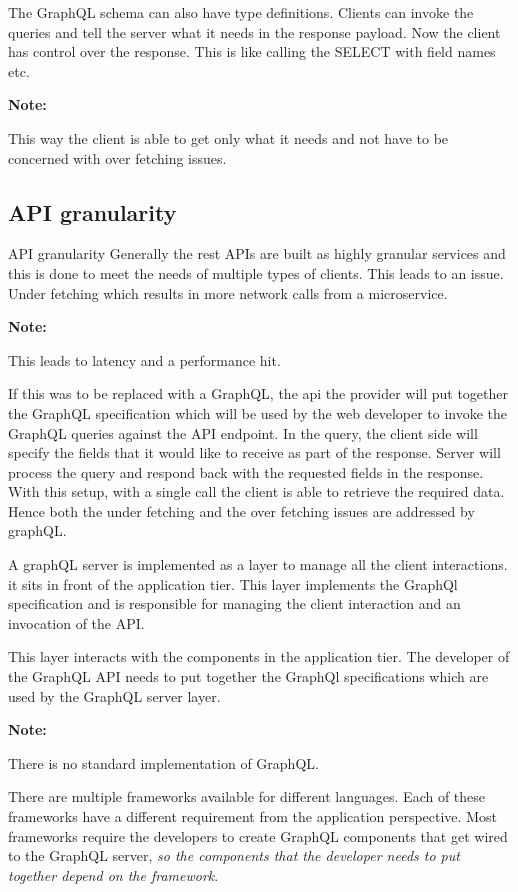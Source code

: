 \documentclass[a4paper, 11pt]{book}
\newenvironment{note}{
    \begin{siderule}
        \textbf{Note: }
        }{
    \end{siderule}
}
\begin{document}
    The GraphQL schema can also have type definitions.
    Clients can invoke the queries and tell the server what it needs in the response payload.
    Now the client has control over the response.
    This is like calling the SELECT with field names etc.
    \begin{note}
        This way the client is able to get only what it needs and not have to be concerned with over fetching issues.
    \end{note}

    \subsection{API granularity}
    API granularity
    Generally the rest APIs are built as highly granular services and this is done to meet the needs of multiple types of clients.
    This leads to an issue.
    Under fetching which results in more network calls from a microservice.
    \begin{note}
        This leads to latency and a performance hit.
    \end{note}

    If this was to be replaced with a GraphQL, the api the provider will put together the GraphQL specification which will be used by the web developer to invoke the GraphQL queries against the API endpoint.
    In the query, the client side will specify the fields that it would like to receive as part of the response.
    Server will process the query and respond back with the requested fields in the response.
    With this setup, with a single call the client is able to retrieve the required data.
    Hence both the under fetching and the over fetching issues are addressed by graphQL.

    A graphQL server is implemented as a layer to manage all the client interactions.
    it sits in front of the application tier.
    This layer implements the GraphQl specification and is responsible for managing the client interaction and an invocation of the API.

    This layer interacts with the components in the application tier.
    The developer of the GraphQL API needs to put together the GraphQl specifications which are used by the GraphQL server layer.

    \begin{note}
        There is no standard implementation of GraphQL.
    \end{note}

    There are multiple frameworks available for different languages.
    Each of these frameworks have a different requirement from the application perspective.
    Most frameworks require the developers to create GraphQL components that get wired to the GraphQL server, \textit{so the components that the developer needs to put together depend on the framework}.
\end{document}
